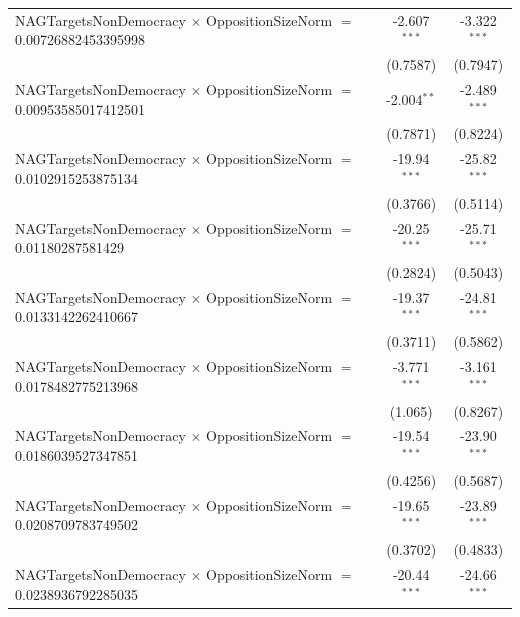 \begin{tabular}{lcc}
   NAGTargetsNonDemocracy $\times$ OppositionSizeNorm $=$ 0.00726882453395998   & -2.607$^{***}$       & -3.322$^{***}$\\   
                                                                                & (0.7587)             & (0.7947)\\   
   NAGTargetsNonDemocracy $\times$ OppositionSizeNorm $=$ 0.00953585017412501   & -2.004$^{**}$        & -2.489$^{***}$\\   
                                                                                & (0.7871)             & (0.8224)\\   
   NAGTargetsNonDemocracy $\times$ OppositionSizeNorm $=$ 0.0102915253875134    & -19.94$^{***}$       & -25.82$^{***}$\\   
                                                                                & (0.3766)             & (0.5114)\\   
   NAGTargetsNonDemocracy $\times$ OppositionSizeNorm $=$ 0.01180287581429      & -20.25$^{***}$       & -25.71$^{***}$\\   
                                                                                & (0.2824)             & (0.5043)\\   
   NAGTargetsNonDemocracy $\times$ OppositionSizeNorm $=$ 0.0133142262410667    & -19.37$^{***}$       & -24.81$^{***}$\\   
                                                                                & (0.3711)             & (0.5862)\\   
   NAGTargetsNonDemocracy $\times$ OppositionSizeNorm $=$ 0.0178482775213968    & -3.771$^{***}$       & -3.161$^{***}$\\   
                                                                                & (1.065)              & (0.8267)\\   
   NAGTargetsNonDemocracy $\times$ OppositionSizeNorm $=$ 0.0186039527347851    & -19.54$^{***}$       & -23.90$^{***}$\\   
                                                                                & (0.4256)             & (0.5687)\\   
   NAGTargetsNonDemocracy $\times$ OppositionSizeNorm $=$ 0.0208709783749502    & -19.65$^{***}$       & -23.89$^{***}$\\   
                                                                                & (0.3702)             & (0.4833)\\   
   NAGTargetsNonDemocracy $\times$ OppositionSizeNorm $=$ 0.0238936792285035    & -20.44$^{***}$       & -24.66$^{***}$\\   

\end{tabular}
